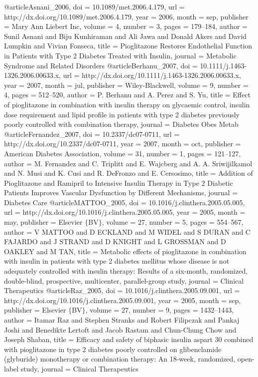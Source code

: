 @article{Asnani_2006,
	doi = {10.1089/met.2006.4.179},
	url = {http://dx.doi.org/10.1089/met.2006.4.179},
	year = 2006,
	month = {sep},
	publisher = {Mary Ann Liebert Inc},
	volume = {4},
	number = {3},
	pages = {179--184},
	author = {Sunil Asnani and Biju Kunhiraman and Ali Jawa and Donald Akers and David Lumpkin and Vivian Fonseca},
	title = {Pioglitazone Restores Endothelial Function in Patients with Type 2 Diabetes Treated with Insulin},
	journal = {Metabolic Syndrome and Related Disorders}
}
@article{Berhanu_2007,
	doi = {10.1111/j.1463-1326.2006.00633.x},
	url = {http://dx.doi.org/10.1111/j.1463-1326.2006.00633.x},
	year = 2007,
	month = {jul},
	publisher = {Wiley-Blackwell},
	volume = {9},
	number = {4},
	pages = {512--520},
	author = {P. Berhanu and A. Perez and S. Yu},
	title = {Effect of pioglitazone in combination with insulin therapy on glycaemic control, insulin dose requirement and lipid profile in patients with type 2 diabetes previously poorly controlled with combination therapy},
	journal = {Diabetes Obes Metab}
}
@article{Fernandez_2007,
	doi = {10.2337/dc07-0711},
	url = {http://dx.doi.org/10.2337/dc07-0711},
	year = 2007,
	month = {oct},
	publisher = {American Diabetes Association},
	volume = {31},
	number = {1},
	pages = {121--127},
	author = {M. Fernandez and C. Triplitt and E. Wajcberg and A. A. Sriwijilkamol and N. Musi and K. Cusi and R. DeFronzo and E. Cersosimo},
	title = {Addition of Pioglitazone and Ramipril to Intensive Insulin Therapy in Type 2 Diabetic Patients Improves Vascular Dysfunction by Different Mechanisms},
	journal = {Diabetes Care}
}
@article{MATTOO_2005,
	doi = {10.1016/j.clinthera.2005.05.005},
	url = {http://dx.doi.org/10.1016/j.clinthera.2005.05.005},
	year = 2005,
	month = {may},
	publisher = {Elsevier $\lbrace$BV$\rbrace$},
	volume = {27},
	number = {5},
	pages = {554--567},
	author = {V MATTOO and D ECKLAND and M WIDEL and S DURAN and C FAJARDO and J STRAND and D KNIGHT and L GROSSMAN and D OAKLEY and M TAN},
	title = {Metabolic effects of pioglitazone in combination with insulin in patients with type 2 diabetes mellitus whose disease is not adequately controlled with insulin therapy: Results of a six-month, randomized, double-blind, prospective, multicenter, parallel-group study},
	journal = {Clinical Therapeutics}
}
@article{Raz_2005,
	doi = {10.1016/j.clinthera.2005.09.001},
	url = {http://dx.doi.org/10.1016/j.clinthera.2005.09.001},
	year = 2005,
	month = {sep},
	publisher = {Elsevier $\lbrace$BV$\rbrace$},
	volume = {27},
	number = {9},
	pages = {1432--1443},
	author = {Itamar Raz and Stephen Stranks and Robert Filipczak and Pankaj Joshi and Benedikte Lertoft and Jacob Rastam and Chun-Chung Chow and Joseph Shaban},
	title = {Efficacy and safety of biphasic insulin aspart 30 combined with pioglitazone in type 2 diabetes poorly controlled on glibenclamide (glyburide) monotherapy or combination therapy: An 18-week, randomized, open-label study},
	journal = {Clinical Therapeutics}
}
